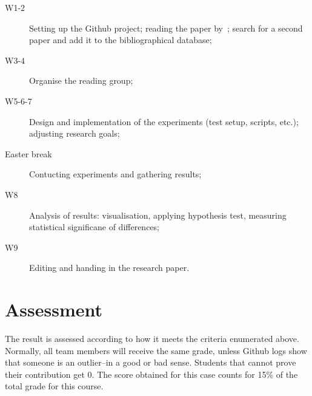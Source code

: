 \documentclass[fleqn,10pt]{artikeltin}
\begin{document}
\begin{description}
	\item[W1-2] Setting up the Github project; reading the paper by~\textcite{Bassil2012}; search for a second paper and add it to the bibliographical database;
	\item[W3-4] Organise the reading group;
	\item[W5-6-7] Design and implementation of the experiments (test setup, scripts, etc.); adjusting research goals;
	\item[Easter break] Contucting experiments and gathering results;
	\item[W8] Analysis of results: visualisation, applying hypothesis test, measuring statistical significane of differences;
	\item[W9] Editing and handing in the research paper.
\end{description}

\section{Assessment}

The result is assessed according to how it meets the criteria enumerated above. Normally, all team members will receive the same grade, unless Github logs show that someone is an outlier--in a good or bad sense. Students that cannot prove their contribution get 0. The score obtained for this case counts for 15\% of the total grade for this course.


\printbibliography[heading=bibintoc]
\end{document}
